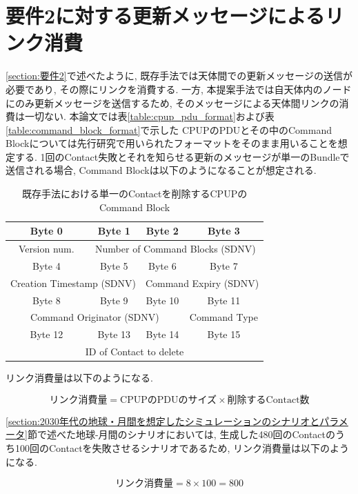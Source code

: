 \section{要件2に対する更新メッセージによるリンク消費}
\label{section:要件2に対する更新メッセージによるリンク消費}
\ref{section:要件2}で述べたように, 既存手法では天体間での更新メッセージの送信が必要であり, 
その際にリンクを消費する. 一方, 本提案手法では自天体内のノードにのみ更新メッセージを送信するため, 
そのメッセージによる天体間リンクの消費は一切ない. 
本論文では表\ref{table:cpup_pdu_format}および表\ref{table:command_block_format}で示した
CPUPのPDUとその中のCommand Blockについては先行研究で用いられたフォーマットをそのまま用いることを想定する. 
1回のContact失敗とそれを知らせる更新のメッセージが単一のBundleで送信される場合, 
Command Blockは以下のようになることが想定される. 


\begin{table}[htbp]
    \centering
    \label{table:delete_command_block_format}
    \begin{tabular}{|c|c|c|c|}
        \hline
        Byte 0 & Byte 1 & Byte 2 & Byte 3 \\
        \hline
        \multicolumn{1}{|c|}{Version num.} & \multicolumn{3}{c|}{Number of Command Blocks (SDNV)} \\
        Byte 4 & Byte 5 & Byte 6 & Byte 7  \\
        \hline
        \multicolumn{2}{|c|}{Creation Timestamp (SDNV)} & \multicolumn{2}{c|}{Command Expiry (SDNV)} \\
        \hline
        Byte 8 & Byte 9 & Byte 10 & Byte 11 \\
        \hline
        \multicolumn{3}{|c|}{Command Originator (SDNV)} & Command Type \\
        \hline
        Byte 12 & Byte 13 & Byte 14 & Byte 15 \\
        \hline
        \multicolumn{4}{|c|}{ID of Contact to delete} \\
        \hline
    \end{tabular}
    \caption{既存手法における単一のContactを削除するCPUPのCommand Block}
    \begin{minipage}{\textwidth}
        \centering
        \vspace{3mm}
    \end{minipage}
  \end{table}

リンク消費量は以下のようになる. 

\begin{equation}
    \text{リンク消費量} = \text{CPUPのPDUのサイズ} \times \text{削除するContact数}
\end{equation}

\ref{section:2030年代の地球・月間を想定したシミュレーションのシナリオとパラメータ}節で述べた地球-月間のシナリオにおいては, 
生成した480回のContactのうち100回のContactを失敗させるシナリオであるため, リンク消費量は以下のようになる. 

\begin{equation}
    \text{リンク消費量} = 8 \times 100 = 800
\end{equation}
